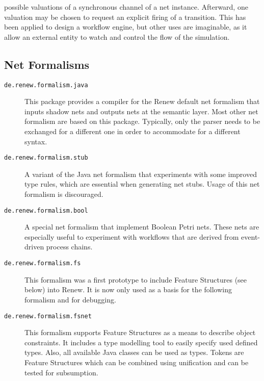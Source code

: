 \begin{description}
  possible valuations of a synchronous channel of a net instance.
  Afterward, one valuation may be chosen to request an explicit firing
  of a transition.
  This has been applied to design a workflow engine, but other
  uses are imaginable, as it allow an external entity to watch and
  control the flow of the simulation.
\end{description}

\subsection{Net Formalisms}

\begin{description}
\item[\texttt{de.renew.formalism.java}] This package 
  provides a compiler for the Renew default net formalism
  that inputs shadow nets and outputs nets at the semantic layer.
  Most other net formalism are based on this package.
  Typically, only the parser needs to be exchanged for a different
  one in order to accommodate for a different syntax.
\item[\texttt{de.renew.formalism.stub}] A variant of the
  Java net formalism that experiments with some improved
  type rules, which are essential when generating net stubs.
  Usage of this net formalism is discouraged.
\item[\texttt{de.renew.formalism.bool}] A special
  net formalism that implement Boolean Petri nets.
  These nets are especially useful to experiment with workflows
  that are derived from event-driven process chains.
\item[\texttt{de.renew.formalism.fs}] This formalism was a first
  prototype to include Feature Structures (see below) into Renew.
  It is now only used as a basis for the following formalism and
  for debugging.
\item[\texttt{de.renew.formalism.fsnet}] This formalism 
  supports Feature Structures as a means to describe object
  constraints.
  It includes a type modelling tool to easily specify
  used defined types. Also, all available Java classes can be
  used as types. Tokens are Feature Structures which can be
  combined using unification and can be tested for subsumption.
\end{description}

